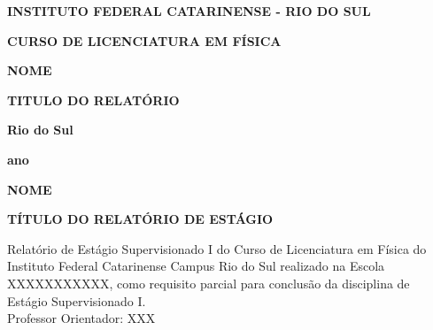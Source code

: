 \documentclass[12pt,a4paper]{article}
\renewcommand{\large}{\fontsize{14}{15}\selectfont}  %
\begin{document}
    \begin{titlepage}

        \begin{center}
                \textbf{INSTITUTO FEDERAL CATARINENSE - RIO DO SUL}
            
                \textbf{CURSO DE LICENCIATURA EM FÍSICA} 
        \end{center}
   
    \vspace*{2cm}
    \begin{center}

        \textbf{NOME}
       
    \end{center}
    \vspace*{5cm}

    \begin{center}
    \large
         \textbf{TITULO DO RELATÓRIO}
    \end{center}
      
    \vfill  
    
    \begin{center}
        \textbf{Rio do Sul}

        \textbf{ano}
        
    \end{center}
    
    

    \end{titlepage}




\thispagestyle{empty} %

    \begin{center}
        \textbf{NOME}
    \end{center}

    \vspace{3 cm}

    \begin{center}
        \large
        \textbf{TÍTULO DO RELATÓRIO DE ESTÁGIO}
    \end{center}

    \vspace{3 cm}
    
    \hfill\begin{minipage}{\dimexpr\textwidth-8,5 cm}
        \linespread{1,0}\selectfont
        \large 
            Relatório de Estágio Supervisionado I do Curso de Licenciatura em Física do Instituto Federal Catarinense Campus Rio do Sul realizado na Escola XXXXXXXXXXX,  como requisito parcial para conclusão da disciplina de Estágio Supervisionado I.\\

            Professor Orientador: XXX

    \xdef\tpd{\the\prevdepth}
    \end{minipage}
\end{document}
